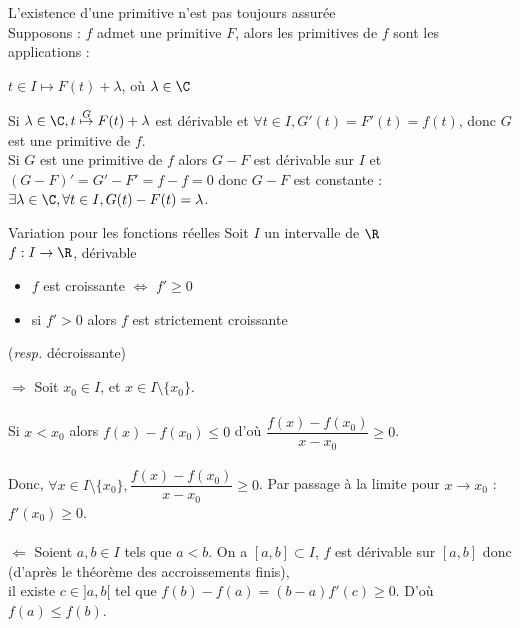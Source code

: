 \documentclass[12pt,a4paper]{report}
\begin{document}
\begin{remarque}
L'existence d'une primitive n'est pas toujours assurée\\
Supposons : $f$ admet une primitive $F$, alors les primitives de $f$ sont les applications : 
\begin{center}
    $t\in I \mapsto F(t) + \lambda$, où $\lambda \in \C$
\end{center}
\end{remarque}

\begin{demo}{}
Si $\lambda \in \C, t \overset{G}{\mapsto} F(t)+\lambda$ est dérivable et $\forall t \in I, G'(t) = F'(t) = f(t)$, donc $G$ est une primitive de $f$. \\
Si $G$ est une primitive de $f$ alors $G-F$ est dérivable sur $I$ et $(G-F)' = G'-F' = f-f = 0$ donc $G-F$ est constante : $\exists \lambda \in \C, \forall t \in I, G(t)-F(t) = \lambda$.
\end{demo}

\begin{theoreme}{Variation pour les fonctions réelles}{}
Soit $I$ un intervalle de $\R$\\
$f:I \to \R$, dérivable 
\begin{itemize}
    \item $f$ est croissante $\Longleftrightarrow$ $f'\geq 0$
    \item si $f'>0$ alors $f$ est strictement croissante 
\end{itemize}
(\textit{resp.} décroissante)
\end{theoreme}

\begin{demo}{}
$\Longrightarrow$ Soit $x_0 \in I$, et $x \in I \setminus \{x_0\}$. \\ \\
Si $x<x_0$ alors $f(x) - f(x_0) \leq 0$ d'où $\dfrac{f(x)-f(x_0)}{x-x_0} \geq 0$. \\ \\
Donc, $\forall x \in I \setminus \{x_0 \}, \dfrac{f(x)-f(x_0)}{x-x_0} \geq 0$. Par passage à la limite pour $x \to x_0$ : $f'(x_0) \geq 0$. \\ \\
$\Longleftarrow$ Soient $a,b \in I$ tels que $a<b$. On a $[a,b] \subset I$, $f$ est dérivable sur $[a,b]$ donc (d'après le théorème des accroissements finis), \\ 
il existe $c \in ]a,b[$ tel que $f(b)-f(a) = (b-a)f'(c) \geq 0$. D'où $f(a) \leq f(b)$.
\end{demo}
\end{document}
